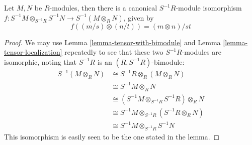 \begin{lemma}
\label{lemma-tensor-product-localization}
Let $M, N$ be $R$-modules, then there is a canonical
$S^{-1}R$-module isomorphism
$f : S^{-1}M \otimes_{S^{-1}R}S^{-1}N \to S^{-1}(M \otimes_R N)$,
given by
$$
f((m/s)\otimes(n/t)) = (m \otimes n)/st
$$
\end{lemma}

\begin{proof}
We may use Lemma \ref{lemma-tensor-with-bimodule}
and Lemma \ref{lemma-tensor-localization} repeatedly to
see that these two
$S^{-1}R$-modules are isomorphic, noting that $S^{-1}R$ is an
$(R, S^{-1}R)$-bimodule:
\begin{align*}
S^{-1}(M \otimes_R N) & \cong S^{-1}R \otimes_R (M \otimes_R N)\\
 & \cong S^{-1}M \otimes_R N\\
 & \cong (S^{-1}M \otimes_{S^{-1}R}S^{-1}R)\otimes_R N\\
 & \cong S^{-1}M \otimes_{S^{-1}R}(S^{-1}R \otimes_R N)\\
 & \cong S^{-1}M \otimes_{S^{-1}R}S^{-1}N
\end{align*}
This isomorphism is easily seen to be the one stated in the lemma.
\end{proof}















